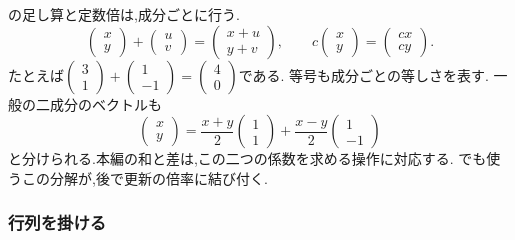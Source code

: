 の足し算と定数倍は,成分ごとに行う.
\[
  \begin{pmatrix}x\\y\end{pmatrix}
  +\begin{pmatrix}u\\v\end{pmatrix}
  =\begin{pmatrix}x+u\\y+v\end{pmatrix},
  \qquad
  c\begin{pmatrix}x\\y\end{pmatrix}
  =\begin{pmatrix}cx\\cy\end{pmatrix}.
\]
たとえば$\begin{pmatrix}3\\1\end{pmatrix}+\begin{pmatrix}1\\-1\end{pmatrix}=\begin{pmatrix}4\\0\end{pmatrix}$である.
等号も成分ごとの等しさを表す.
一般の二成分のベクトルも
\[
  \begin{pmatrix}x\\y\end{pmatrix}
  =\frac{x+y}{2}\begin{pmatrix}1\\1\end{pmatrix}
   +\frac{x-y}{2}\begin{pmatrix}1\\-1\end{pmatrix}
\]
と分けられる.本編の和と差は,この二つの係数を求める操作に対応する.
でも使うこの分解が,後で更新の倍率に結び付く.

\subsubsection{行列を掛ける}

